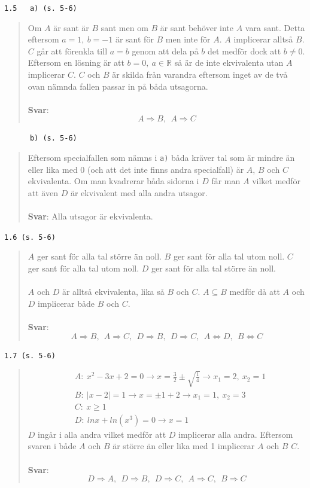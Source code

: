\documentclass[a4paper]{article}
\newcommand{\tskcol}[1]{\textcolor{tskcol}{#1}}
\begin{document}
	\texttt{\tskcol{1.5~~~a) (s. 5-6)}}
	\begin{quotation}
		\noindent
		Om $A$ är sant är $B$ sant men om $B$ är sant behöver inte $A$ vara sant. Detta eftersom $a=1,~b=-1$ är sant för $B$ men inte för $A$. $A$ implicerar alltså $B$. $C$ går att förenkla till $a=b$ genom att dela på $b$ det medför dock att $b\neq0$. Eftersom en lösning är att $b=0,~a\in\mathbb{R}$ så är de inte ekvivalenta utan $A$ implicerar $C$. $C$ och $B$ är skilda från varandra eftersom inget av de två ovan nämnda fallen passar in på båda utsagorna. 
		\\ \\
		\textbf{Svar}: 
		\[A \Rightarrow B,~~ A \Rightarrow C\]
	\end{quotation}
	
	\texttt{\tskcol{~~~~~~b) (s. 5-6)}}
	\begin{quotation}
		\noindent
		Eftersom specialfallen som nämns i \texttt{a)} båda kräver tal som är mindre än eller lika med 0 (och att det inte finns andra specialfall) är $A$, $B$ och $C$ ekvivalenta. Om man kvadrerar båda sidorna i $D$ får man $A$ vilket medför att även $D$ är ekvivalent med alla andra utsagor.
		\\ \\
		\textbf{Svar}: Alla utsagor är ekvivalenta.
	\end{quotation}
	
	\texttt{\tskcol{1.6 (s. 5-6)}}
	\begin{quotation}
		\noindent 
		$A$ ger sant för alla tal större än noll. $B$ ger sant för alla tal utom noll. $C$ ger sant för alla tal utom noll. $D$ ger sant för alla tal större än noll. 
		\\ \\
		$A$ och $D$ är alltså ekvivalenta, lika så $B$ och $C$. $A\subseteq B$ medför då att $A$ och $D$ implicerar både $B$ och $C$.
		\\ \\
		\textbf{Svar}: 
		\[A \Rightarrow B,~~ A \Rightarrow C,~~ D \Rightarrow B,~~ D \Rightarrow C,~~ A \Leftrightarrow D,~~ B \Leftrightarrow C\]
	\end{quotation}
	
	\texttt{\tskcol{1.7 (s. 5-6)}}
	\begin{quotation}
		\begin{align*}
			& A:~x^2-3x+2=0 \rightarrow x = \frac{3}{2} \pm \sqrt{\frac{1}{4}} \rightarrow x_1 = 2,~x_2 = 1 \\
			& B:~|x-2|=1 \rightarrow x=\pm 1+2 \rightarrow x_1=1,~x_2=3 \\
			& C:~x \ge 1 \\
			& D:~lnx + ln(x^3) = 0 \rightarrow x=1
		\end{align*}
		\noindent
		$D$ ingår i alla andra vilket medför att $D$ implicerar alla andra. Eftersom svaren i både $A$ och $B$ är större än eller lika med 1 implicerar $A$ och $B$ $C$.
		\\ \\
		\textbf{Svar}: 
		\[D \Rightarrow A,~~ D \Rightarrow B,~~ D \Rightarrow C,~~ A \Rightarrow C,~~ B \Rightarrow C\]
	\end{quotation}
	
\end{document}
